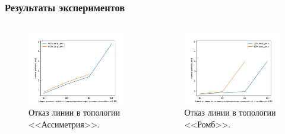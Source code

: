 \documentclass[14pt, handout]{beamer}
\begin{document}
\begin{frame}
\frametitle{Результаты экспериментов}

\begin{minipage}[0.2\textheight]{\textwidth}
	\begin{columns}[T]
		
		\begin{column}{0.5\textwidth}
			\begin{figure}[h!]
				\centering
				\includegraphics[width=1.0\textwidth]{img/5node_res.png}
				\caption*{Отказ линии в топологии <<Ассиметрия>>.}
			\end{figure}
		\end{column}
		\begin{column}{0.5\textwidth}
			\begin{figure}[h!]
			\centering
			\includegraphics[width=1.0\textwidth]{img/4node_res.png}
			\caption*{Отказ линии в топологии <<Ромб>>.}
		\end{figure}
		\end{column}
	\end{columns}
\end{minipage}


\end{frame}
\end{document}
